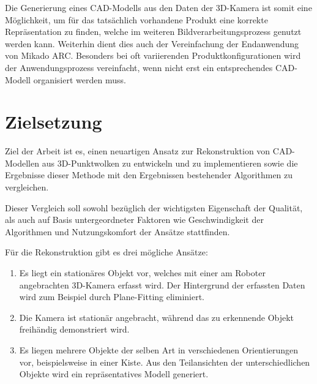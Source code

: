 Die Generierung eines CAD-Modells aus den Daten der 3D-Kamera ist somit eine Möglichkeit, um für das tatsächlich vorhandene Produkt eine korrekte Repräsentation zu finden, welche im weiteren Bildverarbeitungsprozess genutzt werden kann.
Weiterhin dient dies auch der Vereinfachung der Endanwendung von Mikado ARC.
Besonders bei oft variierenden Produktkonfigurationen wird der Anwendungsprozess vereinfacht, wenn nicht erst ein entsprechendes CAD-Modell organisiert werden muss.


\section{Zielsetzung}

Ziel der Arbeit ist es, einen neuartigen Ansatz zur Rekonstruktion von CAD-Modellen aus 3D-Punktwolken zu entwickeln und zu implementieren sowie die Ergebnisse dieser Methode mit den Ergebnissen bestehender Algorithmen zu vergleichen.

Dieser Vergleich soll sowohl bezüglich der wichtigsten Eigenschaft der Qualität, als auch auf Basis untergeordneter Faktoren wie Geschwindigkeit der Algorithmen und Nutzungskomfort der Ansätze stattfinden.

Für die Rekonstruktion gibt es drei mögliche Ansätze:

\begin{enumerate}
\item Es liegt ein stationäres Objekt vor, welches mit einer am Roboter angebrachten 3D-Kamera erfasst wird.
Der Hintergrund der erfassten Daten wird zum Beispiel durch Plane-Fitting \cite{schomaker1959fit} eliminiert.

\item Die Kamera ist stationär angebracht, während das zu erkennende Objekt freihändig demonstriert wird.

\item Es liegen mehrere Objekte der selben Art in verschiedenen Orientierungen vor, beispielsweise in einer Kiste.
Aus den Teilansichten der unterschiedlichen Objekte wird ein repräsentatives Modell generiert.
\end{enumerate}
